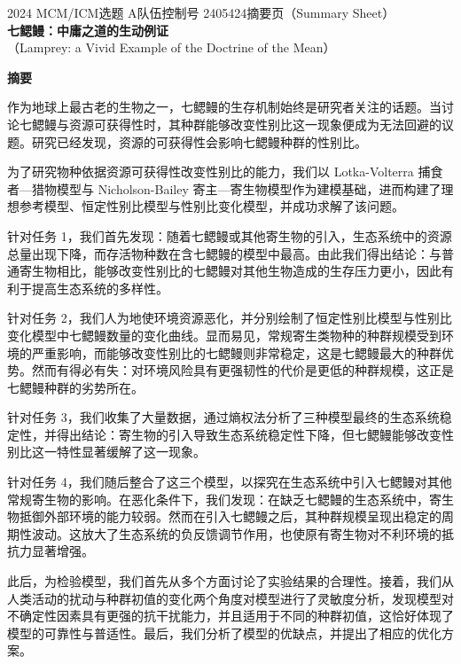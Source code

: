 \documentclass[11pt,a4paper]{ctexart}
\begin{document}
\thispagestyle{empty}
\begin{center}
{\small 2024 MCM/ICM\quad 选题 A\quad 队伍控制号 2405424\quad 摘要页（Summary Sheet）}\\[18pt]
{\LARGE\bfseries 七鳃鳗：中庸之道的生动例证}\\[8pt]
{\large （Lamprey: a Vivid Example of the Doctrine of the Mean）}\\[10pt]
\end{center}

\begin{center}
{\large\bfseries 摘\quad 要}
\end{center}

\vspace{6pt}
作为地球上最古老的生物之一，七鳃鳗的生存机制始终是研究者关注的话题。当讨论七鳃鳗与资源可获得性时，其种群能够改变性别比这一现象便成为无法回避的议题。研究已经发现，资源的可获得性会影响七鳃鳗种群的性别比。

为了研究物种依据资源可获得性改变性别比的能力，我们以 Lotka-Volterra 捕食者—猎物模型与 Nicholson-Bailey 寄主—寄生物模型作为建模基础，进而构建了理想参考模型、恒定性别比模型与性别比变化模型，并成功求解了该问题。

针对任务 1，我们首先发现：随着七鳃鳗或其他寄生物的引入，生态系统中的资源总量出现下降，而存活物种数在含七鳃鳗的模型中最高。由此我们得出结论：与普通寄生物相比，能够改变性别比的七鳃鳗对其他生物造成的生存压力更小，因此有利于提高生态系统的多样性。

针对任务 2，我们人为地使环境资源恶化，并分别绘制了恒定性别比模型与性别比变化模型中七鳃鳗数量的变化曲线。显而易见，常规寄生类物种的种群规模受到环境的严重影响，而能够改变性别比的七鳃鳗则非常稳定，这是七鳃鳗最大的种群优势。然而有得必有失：对环境风险具有更强韧性的代价是更低的种群规模，这正是七鳃鳗种群的劣势所在。

针对任务 3，我们收集了大量数据，通过熵权法分析了三种模型最终的生态系统稳定性，并得出结论：寄生物的引入导致生态系统稳定性下降，但七鳃鳗能够改变性别比这一特性显著缓解了这一现象。

针对任务 4，我们随后整合了这三个模型，以探究在生态系统中引入七鳃鳗对其他常规寄生物的影响。在恶化条件下，我们发现：在缺乏七鳃鳗的生态系统中，寄生物抵御外部环境的能力较弱。然而在引入七鳃鳗之后，其种群规模呈现出稳定的周期性波动。这放大了生态系统的负反馈调节作用，也使原有寄生物对不利环境的抵抗力显著增强。

此后，为检验模型，我们首先从多个方面讨论了实验结果的合理性。接着，我们从人类活动的扰动与种群初值的变化两个角度对模型进行了灵敏度分析，发现模型对不确定性因素具有更强的抗干扰能力，并且适用于不同的种群初值，这恰好体现了模型的可靠性与普适性。最后，我们分析了模型的优缺点，并提出了相应的优化方案。
\end{document}
